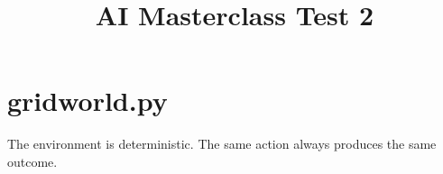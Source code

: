 \documentclass[12pt, a4paper]{article}
\title{AI Masterclass Test 2}
\author{}
\date{}
\begin{document}
\section{gridworld.py}
The environment is deterministic. The same action always produces the same outcome.
\end{document}
